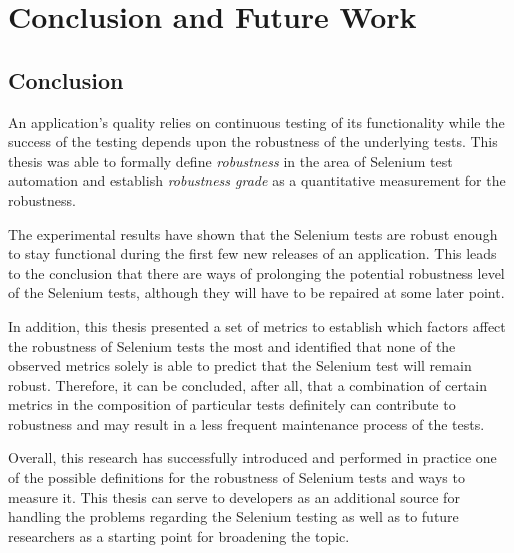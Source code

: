 \chapter{Conclusion and Future Work} %

\label{Chapter7} %


\section{Conclusion}
\label{conclusion}
An application's quality relies on continuous testing of its functionality while the success of the testing depends upon the robustness of the underlying tests. This thesis was able to formally define \textit{robustness} in the area of Selenium test automation and establish \textit{robustness grade} as a quantitative measurement for the robustness. 

The experimental results have shown that the Selenium tests are robust enough to stay functional during the first few new releases of an application. This leads to the conclusion that there are ways of prolonging the potential robustness level of the Selenium tests, although they will have to be repaired at some later point.

In addition, this thesis presented a set of metrics to establish which factors affect the robustness of Selenium tests the most and identified that none of the observed metrics solely is able to predict that the Selenium test will remain robust. Therefore, it can be concluded, after all, that a combination of certain metrics in the composition of particular tests definitely can contribute to robustness and may result in a less frequent maintenance process of the tests.

Overall, this research has successfully introduced and performed in practice one of the possible definitions for the robustness of Selenium tests and ways to measure it. This thesis can serve to developers as an additional source for handling the problems regarding the Selenium testing as well as to future researchers as a starting point for broadening the topic.




